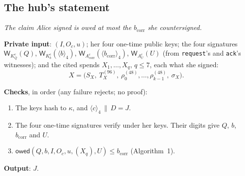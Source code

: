 \documentclass[11pt]{article}
\theoremstyle{plain}
\theoremstyle{definition}
\newcommand{\bcorr}{b_{\mathrm{corr}}}
\newcommand{\tx}[1]{\texttt{#1}}
\newcommand{\be}[2]{\langle #1\rangle_{#2}}
\newcommand{\Wots}{\mathsf{W}}
\newcommand{\owed}{\mathsf{owed}}
\newcommand{\Oc}{O_c}
\newcommand{\KQ}{K_{Q}^{c}}
\newcommand{\Kb}{K_{b}^{c}}
\newcommand{\Acorr}{A_{\mathrm{corr}}^{c}}
\newcommand{\AU}{A_{U}^{c}}
\begin{document}
\subsection{The hub's statement}\label{sec:statement}

\emph{The claim Alice signed is owed at most the $\bcorr$ she
countersigned.}

\textbf{Private input}: $(I, \Oc, u)$; her four one-time public keys;
the four signatures $\Wots_{\KQ}(Q)$, $\Wots_{\Kb}(\be{b}{4})$,
$\Wots_{\Acorr}(\be{\bcorr}{4})$, $\Wots_{\AU}(U)$ (from \tx{request}'s
and \tx{ack}'s witnesses); and the cited spends $X_1, \dots, X_q$, $q \le
7$, each what she signed:
\[
  X = \big(S_X,\ T_X^{(96)},\ \rho_0^{(48)}, \dots, \rho_{k-1}^{(48)},\
  \sigma_X\big).
\]

\textbf{Checks}, in order (any failure rejects; no proof):
\begin{enumerate}[nosep]
\item The keys hash to $\kappa$, and $\be{c}{4} \,\|\, D = J$.
\item The four one-time signatures verify under her keys. Their digits
  give $Q$, $b$, $\bcorr$ and $U$.
\item $\owed(Q, b, I, \Oc, u, (X_q), U) \le \bcorr$ (Algorithm~1).
\end{enumerate}
\textbf{Output}: $J$.
\end{document}
